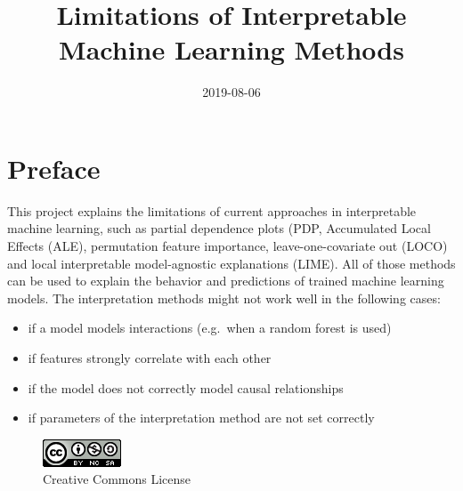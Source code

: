 \documentclass[
]{krantz}
\title{Limitations of Interpretable Machine Learning Methods}
\date{2019-08-06}
\providecommand{\tightlist}{%
  \setlength{\itemsep}{0pt}\setlength{\parskip}{0pt}}
\begin{document}
\maketitle


\thispagestyle{empty}

\begin{center}
\end{center}

\setlength{\abovedisplayskip}{-5pt}
\setlength{\abovedisplayshortskip}{-5pt}

{
\hypersetup{linkcolor=}
\setcounter{tocdepth}{0}
\tableofcontents
}
\listoftables
\listoffigures
\hypertarget{preface}{%
\chapter*{Preface}\label{preface}}


This project explains the limitations of current approaches in interpretable machine learning, such as partial dependence plots (PDP, Accumulated Local Effects (ALE), permutation feature importance, leave-one-covariate out (LOCO) and local interpretable model-agnostic explanations (LIME).
All of those methods can be used to explain the behavior and predictions of trained machine learning models.
The interpretation methods might not work well in the following cases:

\begin{itemize}
\tightlist
\item
  if a model models interactions (e.g.~when a random forest is used)
\item
  if features strongly correlate with each other
\item
  if the model does not correctly model causal relationships
\item
  if parameters of the interpretation method are not set correctly
\end{itemize}

\begin{figure}
\centering
\includegraphics{images/by-nc-sa.png}
\caption{Creative Commons License}
\end{figure}
\end{document}
